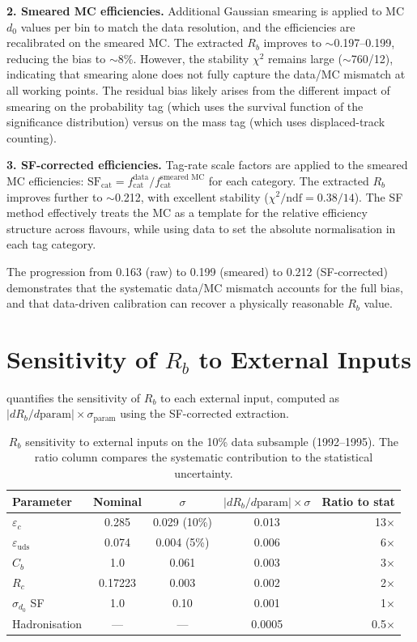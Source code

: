 \documentclass[11pt,a4paper]{article}
\begin{document}
\textbf{2. Smeared MC efficiencies.}
Additional Gaussian smearing is applied to MC $d_0$ values
per bin to match the data resolution, and the efficiencies are
recalibrated on the smeared MC.
The extracted $R_b$ improves to $\sim$0.197--0.199, reducing the
bias to $\sim$8\%.
However, the stability $\chi^2$ remains large ($\sim$760/12),
indicating that smearing alone does not fully capture the data/MC
mismatch at all working points.
The residual bias likely arises from the different impact of
smearing on the probability tag (which uses the survival function
of the significance distribution) versus on the mass tag (which
uses displaced-track counting).

\textbf{3. SF-corrected efficiencies.}
Tag-rate scale factors are applied to the smeared MC efficiencies:
$\text{SF}_\text{cat} = f_\text{cat}^\text{data} /
f_\text{cat}^\text{smeared MC}$ for each category.
The extracted $R_b$ improves further to $\sim$0.212, with
excellent stability ($\chi^2/\text{ndf} = 0.38/14$).
The SF method effectively treats the MC as a template for the
relative efficiency structure across flavours, while using data to
set the absolute normalisation in each tag category.

The progression from 0.163 (raw) to 0.199 (smeared) to 0.212
(SF-corrected) demonstrates that the systematic data/MC mismatch
accounts for the full bias, and that data-driven calibration can
recover a physically reasonable $R_b$ value.

\section{Sensitivity of $R_b$ to External Inputs}
\label{app:sensitivity}

 quantifies the sensitivity of $R_b$ to
each external input, computed as
$|dR_b/d\text{param}| \times \sigma_\text{param}$ using the
SF-corrected extraction.

\begin{table}[htbp]
\centering
\caption{$R_b$ sensitivity to external inputs on the 10\% data
subsample (1992--1995). The ratio column compares the systematic
contribution to the statistical uncertainty.}
\label{tbl:sensitivity}
\begin{tabular}{lcccr}
\toprule
Parameter & Nominal & $\sigma$ &
$|dR_b/d\text{param}| \times \sigma$ & Ratio to stat \\
\midrule
$\varepsilon_c$ & 0.285 & 0.029 (10\%) & 0.013 & 13$\times$ \\
$\varepsilon_\text{uds}$ & 0.074 & 0.004 (5\%) & 0.006 & 6$\times$ \\
$C_b$ & 1.0 & 0.061 & 0.003 & 3$\times$ \\
$R_c$ & 0.17223 & 0.003 & 0.002 & 2$\times$ \\
$\sigma_{d_0}$ SF & 1.0 & 0.10 & 0.001 & 1$\times$ \\
Hadronisation & --- & --- & 0.0005 & 0.5$\times$ \\
\bottomrule
\end{tabular}
\end{table}
\end{document}
